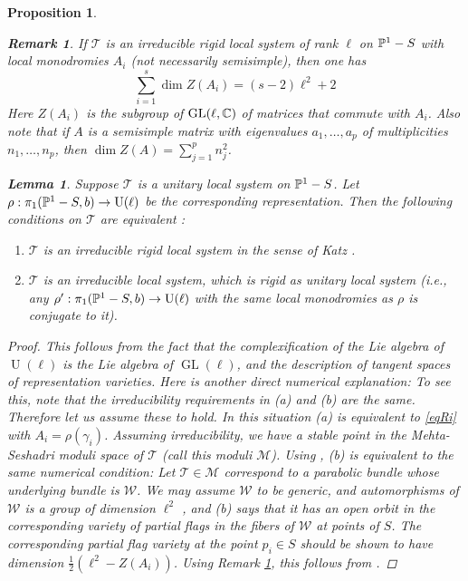 \documentclass[11pt]{amsart}
\newcommand\op{\operatorname}
\newcommand\rigid{\mathcal{T}}
\newcommand\mw{\mathcal{W}}
\newtheorem{remark}[theorem]{ Remark}
\newtheorem{proposition}[theorem]{Proposition}
\newtheorem{lemma}[theorem]{Lemma}
\numberwithin{theorem}{subsection}
\begin{document}
{\begin{proposition}
\begin{remark}\label{numerics}
If $\rigid$  is an irreducible rigid local system of rank $\ell$  on $\Bbb{P}^1-S$ with local monodromies $A_i$ (not necessarily semisimple), then one has \cite[Theorem 1.1.2]{Katz}
\begin{equation}\label{eqRi}
\sum_{i=1}^s \dim Z(A_i)= (s-2) \ell^2+2
\end{equation}
Here $Z(A_i)$ is the subgroup of $\op{GL}(\ell,\Bbb{C})$ of matrices that commute with $A_i$. Also note that if $A$ is a semisimple matrix  with eigenvalues $a_1,\dots,a_p$ of multiplicities $n_1,\dots,n_p$, then $\dim Z(A)=\sum_{j=1}^p n_j^2$.
\end{remark}
\begin{lemma}\label{RigidRem}
Suppose  $\rigid$ is a  unitary local system on $\Bbb{P}^1-S$. Let $\rho: \pi_1(\Bbb{P}^1-S,b)\to \op{U}(\ell)$ be the  corresponding representation. Then the following conditions on $\rigid$ are equivalent :
\begin{enumerate}
\item[(a)]$\rigid$ is an irreducible rigid local system in the sense of Katz \cite{Katz}.
\item[(b)] $\rigid$ is an irreducible local system, which is rigid as unitary local system (i.e., any $\rho': \pi_1(\Bbb{P}^1-S,b)\to \op{U}(\ell)$ with the same local monodromies as $\rho$ is conjugate to it).
\end{enumerate}
\end{lemma}
\begin{proof}
This follows from the fact that the complexification of the Lie algebra of $\op{U}(\ell)$ is the Lie algebra of $\op{GL}(\ell)$, and the description of tangent spaces of representation varieties. Here is another direct numerical explanation:
To see this, note that the irreducibility requirements in (a) and (b) are the same. Therefore let us assume these to hold. In this situation (a) is equivalent to \eqref{eqRi}  with $A_i=\rho(\gamma_i)$.
Assuming irreducibility, we have a stable point in the Mehta-Seshadri moduli space of $\rigid$ (call this moduli $\mathcal{M}$). Using \cite[Lemma 5.4]{BTIFR}, (b) is equivalent to the same numerical condition:
Let $\rigid\in\mathcal{M}$ correspond to a parabolic bundle whose underlying bundle is $\mw$. We may assume $\mw$ to be generic, and automorphisms of $\mw$ is a group of dimension $\ell^2$ \cite[Lemma 9.1]{BTIFR}, and (b) says that it has an open orbit in the  corresponding variety of partial flags in the fibers of $\mw$ at points of $S$. The corresponding partial  flag variety at the point $p_i\in S$ should be shown to have dimension $\frac{1}{2}(\ell^2-Z(A_i))$. Using Remark
\ref{numerics}, this follows from \cite[Lemma 1.2]{BTIFR}.
\end{proof}


\end{proposition}}
\end{document}
